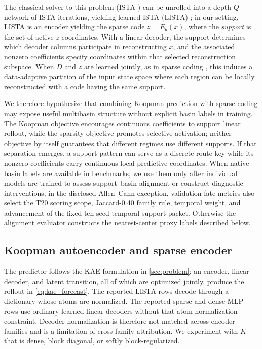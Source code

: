 \documentclass[11pt]{article}
\newcommand{\Enc}{E_\theta}
\begin{document}
The classical solver to this problem (ISTA \citep{beck2009fast}) can be unrolled into a depth-\(Q\) network of ISTA iterations, yielding learned ISTA (LISTA) \citep{gregor_learning_2010}; in our setting, LISTA is an encoder yielding the sparse code \(z=\Enc(x)\), where the \emph{support} is the set of active $z$ coordinates.
With a linear decoder, the support determines which decoder columns participate in reconstructing \(x\), and the associated nonzero coefficients specify coordinates within that selected reconstruction subspace. When \(D\) and \(z\) are learned jointly, as in sparse coding \citep{olshausen_emergence_1996}, this induces a data-adaptive partition of the input state space where each region can be locally reconstructed with a code having the same support.

We therefore hypothesize that combining Koopman prediction with sparse coding may expose useful multibasin structure without explicit basin labels in training.
The Koopman objective encourages continuous coefficients to support linear rollout, while the sparsity objective promotes selective activation; neither objective by itself guarantees that different regimes use different supports.
If that separation emerges, a support pattern can serve as a discrete route key while its nonzero coefficients carry continuous local predictive coordinates.
When native basin labels are available in benchmarks, we use them only after individual models are trained to assess support--basin alignment or construct diagnostic interventions; in the disclosed Allen--Cahn exception, validation fate metrics also select the T20 scoring scope, Jaccard-0.40 family rule, temporal weight, and advancement of the fixed ten-seed temporal-support packet. Otherwise the alignment evaluator constructs the nearest-center proxy labels described below.

\subsection{Koopman autoencoder and sparse encoder}
\label{sec:method_model}

The predictor follows the KAE formulation in \cref{sec:problem}: an encoder, linear decoder, and latent transition, all of which are optimized jointly, produce the rollout in \cref{eq:kae_forecast}. The reported LISTA rows decode through a dictionary whose atoms are normalized. The reported sparse and dense MLP rows use ordinary learned linear decoders without that atom-normalization constraint. Decoder normalization is therefore not matched across encoder families and is a limitation of cross-family attribution. We experiment with \(K\) that is dense, block diagonal, or softly block-regularized.
\end{document}
